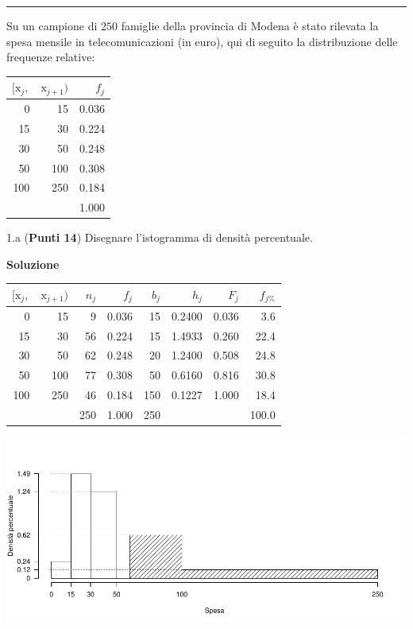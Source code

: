 \documentclass[
  11pt,
]{book}
\theoremstyle{mytheoremstyle}
\theoremstyle{mydefstyle}
\begin{document}
\begin{center}\rule{0.5\linewidth}{0.5pt}\end{center}

\newpage

Su un campione di \(250\) famiglie della provincia di Modena è stato rilevata la spesa mensile in telecomunicazioni (in euro), qui di seguito
la distribuzione delle frequenze relative:

\begin{table}[H]
\centering
\begin{tabular}{rrr}
\toprule
$[\text{x}_j,$ & $\text{x}_{j+1})$ & $f_j$\\
\midrule
0 & 15 & 0.036\\
15 & 30 & 0.224\\
30 & 50 & 0.248\\
50 & 100 & 0.308\\
100 & 250 & 0.184\\
 &  & 1.000\\
\bottomrule
\end{tabular}
\end{table}

1.a (\textbf{Punti 14}) Disegnare l'istogramma di densità percentuale.

\textbf{Soluzione}

\begin{table}[H]
\centering
\begin{tabular}{rrrrrrrr}
\toprule
$[\text{x}_j,$ & $\text{x}_{j+1})$ & $n_j$ & $f_j$ & $b_j$ & $h_j$ & $F_j$ & $f_{j\%}$\\
\midrule
0 & 15 & 9 & 0.036 & 15 & 0.2400 & 0.036 & 3.6\\
15 & 30 & 56 & 0.224 & 15 & 1.4933 & 0.260 & 22.4\\
30 & 50 & 62 & 0.248 & 20 & 1.2400 & 0.508 & 24.8\\
50 & 100 & 77 & 0.308 & 50 & 0.6160 & 0.816 & 30.8\\
100 & 250 & 46 & 0.184 & 150 & 0.1227 & 1.000 & 18.4\\
 &  & 250 & 1.000 & 250 &  &  & 100.0\\
\bottomrule
\end{tabular}
\end{table}

\begin{center}\includegraphics{Appunti_di_Statistica_2025_files/figure-latex/25-test-functions-18-1} \end{center}
\end{document}
